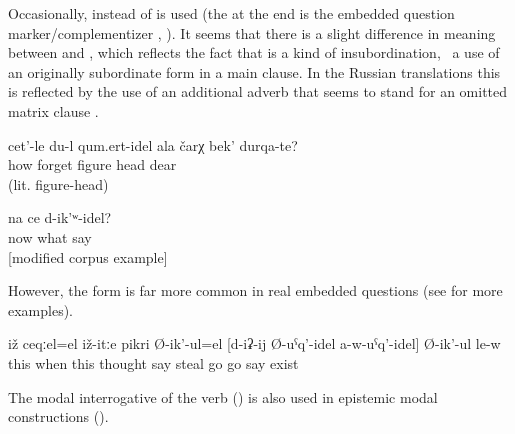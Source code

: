 Occasionally,  instead of  is used (the  at the end is the embedded question marker\slash complementizer , ). It seems that there is a slight difference in meaning between  and , which reflects the fact that  is a kind of insubordination, \tie\ a use of an originally subordinate form in a main clause. In the Russian translations this is reflected by the use of an additional adverb   that seems to stand for an omitted matrix clause .
%
\begin{exe}
	\ex	\label{ex:How can I forget your dear figure}
	\gll	cet'-le	du-l	qum.ert-idel 	ala	čarχ		bek'	durqa-te?\\
		how		forget	 figure		head	dear\\
	\glt	{} (lit. figure-head)

	\ex	\label{ex:‎‎Now what can we say}
	\gll	na	ce	d-ik'ʷ-idel?\\
		now	what	say\\
	\glt	{} [modified corpus example]
\end{exe}

However, the form  is far more common in real embedded questions  (see  for more examples).
%
\begin{exe}
	\ex	\label{ex:‎This is when he is probably thinking}
	\gll	iž	ceqːel=el	iž-itːe	pikri	Ø-ik'-ul=el		[d-iʡ-ij	Ø-uˁq'-idel	a-w-uˁq'-idel]	Ø-ik'-ul	le-w\\
		this	when	this	thought	say		steal	go\tsc{.pfv-modq}	go	say	exist\\
	\glt	{}
\end{exe}

The modal interrogative of the verb  ()  is also used in epistemic modal constructions ().
